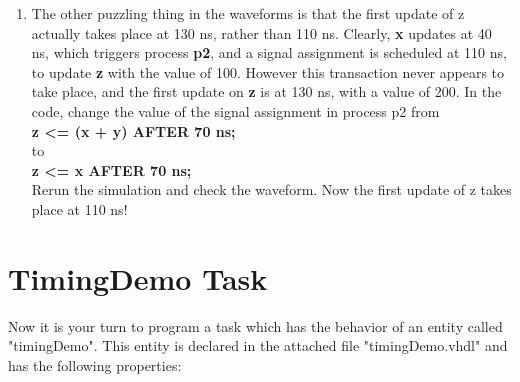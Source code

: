 \documentclass[a4paper,12pt]{article}
\newcommand\tab[1][1cm]{\hspace*{#1}}
\begin{document}
\begin{enumerate}
\item %
The other puzzling thing in the waveforms is that the first update of z actually takes place at 130 ns, rather than 110 ns. Clearly, \textbf{x} updates at 40 ns, which triggers process \textbf{p2}, and a signal assignment is scheduled at 110 ns, to update \textbf{z} with the value of 100. However this transaction never appears to take place, and the first update on \textbf{z} is at 130 ns, with a value of 200.
In the code, change the value of the signal assignment in process p2 from
\\
\tab \textbf{z \textless= (x + y) AFTER 70 ns;}
\\
to
\\
\tab \textbf{z \textless= x AFTER 70 ns;}
\\
Rerun the simulation and check the waveform. Now the first update of z takes place at 110 ns!
\\
\end{enumerate}



\section*{TimingDemo Task}

Now it is your turn to program a task which has the behavior of an entity called "timingDemo". This entity is declared in the attached file "timingDemo.vhdl" and has the following properties:
\end{document}
